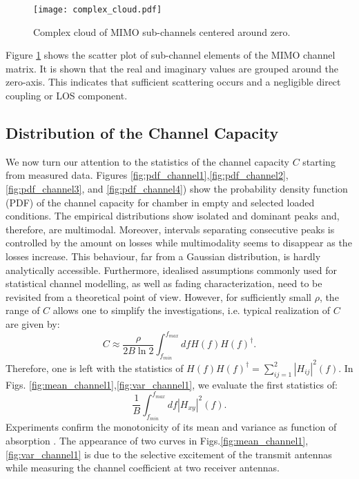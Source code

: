 \documentclass[10pt, final, journal, letterpaper, oneside, twocolumn]{IEEEtran}
\begin{document}
\begin{figure}
    \centering
    \texttt{[image: complex\_cloud.pdf]}
    \caption{Complex cloud of MIMO sub-channels centered around zero.}
    \label{fig:complex_cloud}
\end{figure}
Figure \ref{fig:complex_cloud} shows the scatter plot of sub-channel elements of the MIMO channel matrix. It is shown that the real and imaginary values are grouped around the zero-axis. This indicates that sufficient scattering occurs and a negligible direct coupling or LOS component.

\subsection{Distribution of the Channel Capacity}
We now turn our attention to the statistics of the channel capacity $C$ starting from measured data. 
Figures \ref{fig:pdf_channel1},\ref{fig:pdf_channel2},\ref{fig:pdf_channel3}, and \ref{fig:pdf_channel4}) show the probability density function (PDF) of the channel capacity for chamber in empty and selected loaded conditions. The empirical distributions show isolated and dominant peaks and, therefore, are multimodal. Moreover, intervals separating consecutive peaks is controlled by the amount on losses while multimodality seems to disappear as the losses increase. This behaviour, far from a Gaussian distribution, is hardly analytically accessible. 
Furthermore, idealised assumptions commonly used for statistical channel modelling, as well as fading characterization, need to be revisited from a theoretical point of view.  However, for sufficiently small $\rho$, the range of $C$ allows one to simplify the investigations, i.e. typical realization of $C$ are given by: 
\begin{equation}\label{eq:Capprox1}
C\approx\frac{\rho }{2 B\ln 2}\int_{f_{min}}^{f_{max}} df  H(f) H(f)^\dagger.
\end{equation}
Therefore, one is left with the statistics of $ H(f)H(f)^\dagger=\sum_{ij=1}^{2}|H_{ij}|^2(f)$. In Figs. \ref{fig:mean_channel1},\ref{fig:var_channel1}, we evaluate the first statistics of:
\begin{equation}\label{Hxy2stat}
    \frac{1}{B}\int_{f_{min}}^{f_{max}}df |H_{xy}|^2(f).
\end{equation}
Experiments confirm the monotonicity of its mean and variance as function of absorption \cite{Gradoni2020}. The appearance of two curves in Figs.\ref{fig:mean_channel1},\ref{fig:var_channel1} is due to the selective excitement of the transmit antennas while measuring the channel coefficient at two receiver antennas. 
\end{document}
